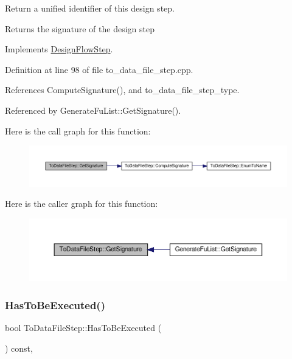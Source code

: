 Return a unified identifier of this design step. 

\begin{DoxyReturn}{Returns}
the signature of the design step 
\end{DoxyReturn}


Implements \hyperlink{classDesignFlowStep_ab111e3d4058615c2dedc0505978d4699}{Design\+Flow\+Step}.



Definition at line 98 of file to\+\_\+data\+\_\+file\+\_\+step.\+cpp.



References Compute\+Signature(), and to\+\_\+data\+\_\+file\+\_\+step\+\_\+type.



Referenced by Generate\+Fu\+List\+::\+Get\+Signature().

Here is the call graph for this function\+:
\nopagebreak
\begin{figure}[H]
\begin{center}
\leavevmode
\includegraphics[width=350pt]{d6/d54/classToDataFileStep_ad4d235d11fd907c9d593f73e55609022_cgraph}
\end{center}
\end{figure}
Here is the caller graph for this function\+:
\nopagebreak
\begin{figure}[H]
\begin{center}
\leavevmode
\includegraphics[width=350pt]{d6/d54/classToDataFileStep_ad4d235d11fd907c9d593f73e55609022_icgraph}
\end{center}
\end{figure}
\mbox{\label{classToDataFileStep_a22c665fe60796cdd10b779df3198cb51}} 
\subsubsection{\texorpdfstring{Has\+To\+Be\+Executed()}{HasToBeExecuted()}}
{\footnotesize\ttfamily bool To\+Data\+File\+Step\+::\+Has\+To\+Be\+Executed (\begin{DoxyParamCaption}{ }\end{DoxyParamCaption}) const\hspace{0.3cm}{\ttfamily [override]}, {\ttfamily [virtual]}}



